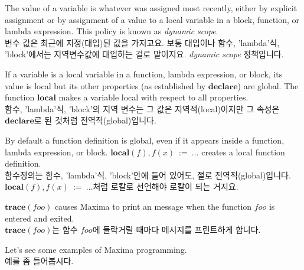 \documentclass[12pt]{article}
\begin{document}
The value of a variable is whatever was assigned most recently,
either by explicit assignment or by assignment of a value to a local variable
in a block, function, or lambda expression.
This policy is known as {\it dynamic scope}. \\
변수 값은 최근에 지정(대입)된 값을 가지고요. 보통 대입이나 함수, 'lambda'식, 
'block'에서는 지역변수값에 대입하는 걸로 말이지요. {\it dynamic scope} 정책입니다.

If a variable is a local variable in a function, lambda expression, or block,
its value is local but its other properties
(as established by $\mathbf{declare}$)
are global.
The function $\mathbf{local}$ makes a variable local with respect to all properties. \\
함수, 'lambda'식, 'block'의 지역 변수는 그 값은 지역적(local)이지만 그 속성은 $\mathbf{declare}$로
된 것처럼 전역적(global)입니다.

By default a function definition is global,
even if it appears inside a function, lambda expression, or block.
$\mathbf{local}(f), f(x) \mathbf{\ :=\ } \ldots$ creates a local function definition. \\
함수정의는 함수, 'lambda'식, 'block'안에 들어 있어도, 절로 전역적(global)입니다.
$\mathbf{local}(f), f(x) \mathbf{\ :=\ } \ldots$처럼 로칼로 선언해야 로칼이 되는 거지요.

$\mathbf{trace}(\mathit{foo})$ causes Maxima to print an message when the function $\mathit{foo}$
is entered and exited. \\
$\mathbf{trace}(\mathit{foo})$는 함수 $\mathit{foo}$에 들락거릴 때마다 메시지를 프린트하게 합니다.

Let's see some examples of Maxima programming. \\
예를 좀 들어봅시다.
\end{document}
